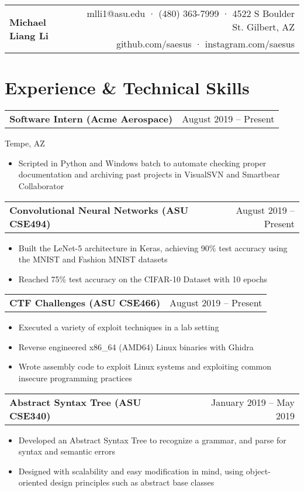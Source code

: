 \documentclass[10pt]{article}
\makeatletter
\newcommand{\headingtitle}[3]{
\begin{tabular*}{7in}{l@{\extracolsep{\fill}}r}
	\multirow{2}{*}{#1}&#2\\
	&#3\\
\end{tabular*}}
\newcommand{\subheadingt}[2]{ 	
	\begin{tabular*}{7in}{l@{\extracolsep{\fill}}r}
		\textbf{#1} & #2 \\
	\end{tabular*}}
\makeatother
\begin{document}
	
	\headingtitle{\textbf{\huge Michael Liang Li}}{mlli1@asu.edu · (480) 363-7999 · 4522 S Boulder St. Gilbert, AZ}{github.com/saesus · instagram.com/saesus}
	\vspace{-2em}
	
	\section{Experience \& Technical Skills}
		\subheadingt{Software Intern (Acme Aerospace)}{August 2019 – Present}
		Tempe, AZ\\
		\begin{itemize}[noitemsep, topsep=0pt]
			\item Scripted in Python and Windows batch to automate checking proper documentation and archiving past projects in VisualSVN and Smartbear Collaborator
		\end{itemize}
		\vspace{0.1in}
		
		\subheadingt{Convolutional Neural Networks (ASU CSE494)}{August 2019 –  Present}
		\begin{itemize}[noitemsep, topsep=0pt]
			\item Built the LeNet-5 architecture in Keras, achieving 90\% test accuracy using the MNIST and Fashion MNIST datasets 
			\item Reached 75\% test accuracy on the CIFAR-10 Dataset with 10 epochs
		\end{itemize}
		\vspace{0.1in}
		
		\subheadingt{CTF Challenges (ASU CSE466)}{August 2019 –  Present}
			\begin{itemize}[noitemsep, topsep=0pt]
				\item Executed a variety of exploit techniques in a lab setting 
				\item Reverse engineered x86\_64 (AMD64) Linux binaries with Ghidra
				\item Wrote assembly code to exploit Linux systems and exploiting common insecure programming practices
			\end{itemize}
		\vspace{0.1in}	
		
		\subheadingt{Abstract Syntax Tree (ASU CSE340)}{January 2019 – May 2019}
		\begin{itemize}[noitemsep, topsep=0pt]
			\item Developed an Abstract Syntax Tree to recognize a grammar, and parse for syntax and semantic errors
			\item Designed with scalability and easy modification in mind, using object-oriented design principles such as abstract base classes
		\end{itemize}
		\vspace{0.1in}
		
\end{document}
